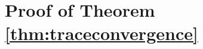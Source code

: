 \documentclass[12pt]{article}
\numberwithin{equation}{section}
\newtheorem{proposition}{Proposition}[section]
\numberwithin{equation}{section}
\theoremstyle{definition}
\renewcommand{\1}{\bf 1}
\begin{document}
\section{Proof of Theorem \ref{thm:traceconvergence}}\label{sec:proof}
\end{document}
